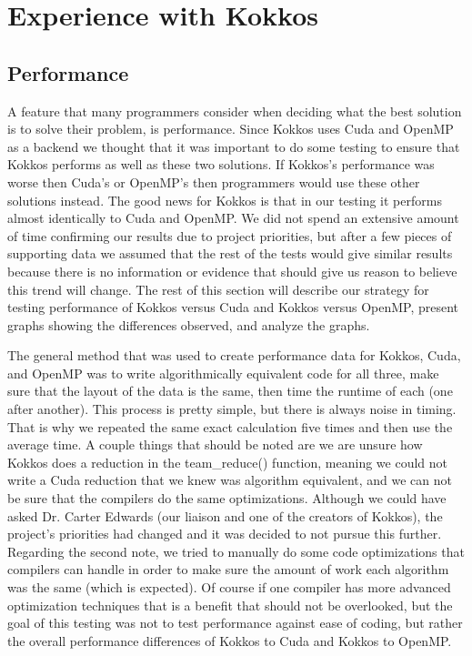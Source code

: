 \chapter{Experience with Kokkos}
\section{Performance}
A feature that many programmers consider when deciding what the best solution is
to solve their problem, is performance. Since Kokkos uses Cuda and OpenMP as a
backend we thought that it was important to do some testing to ensure that
Kokkos performs as well as these two solutions. If Kokkos's performance was
worse then Cuda's or OpenMP's then programmers would use these other solutions
instead. The good news for Kokkos is that in our testing it performs almost
identically to Cuda and OpenMP. We did not spend an extensive amount of time
confirming our results due to project priorities, but after a few pieces of supporting data we assumed that
the rest of the tests would give similar results because there is no information or evidence
that should give us reason to believe this trend will change. The rest of this
section will describe our strategy for testing performance of Kokkos versus Cuda
and Kokkos versus OpenMP, present graphs showing the differences observed, and
analyze the graphs.

The general method that was used to create performance data for Kokkos, Cuda,
and OpenMP was to write algorithmically equivalent code for all three, make sure
that the layout of the data is the same, then time the runtime of each (one
after another). This process is pretty simple, but there is always noise in
timing. That is why we repeated the same exact calculation five times and 
then use the average time. A couple things that should be noted are we are
unsure how Kokkos does a reduction in the team\_reduce() function, meaning we
could not write a Cuda reduction that we knew was algorithm equivalent, and we
can not be sure that the compilers do the same optimizations. Although
we could have asked Dr. Carter Edwards (our liaison and one of the creators of 
Kokkos), the project's priorities had changed and it was decided to not pursue
this further. Regarding the second note, we tried to manually do some code
optimizations that compilers can handle in order to make sure the amount of work
each algorithm was the same (which is expected). Of course if one compiler has
more advanced optimization techniques that is a benefit that should not be
overlooked, but the goal of this testing was not to test performance against
ease of coding, but rather the overall performance differences of Kokkos to 
Cuda and Kokkos to OpenMP. 

